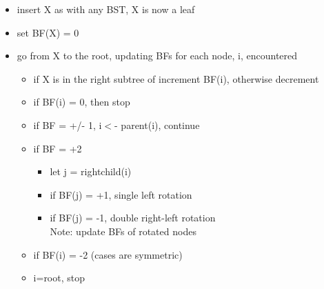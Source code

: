 \documentclass{article}
\begin{document}
		\begin{itemize}
			\item insert X as with any BST, X is now a leaf
			\item set BF(X) = 0
			\item go from X to the root, updating BFs for each node, i, encountered
			\begin{itemize}
				\item if X is in the right subtree of increment BF(i), otherwise decrement
				\item if BF(i) = 0, then stop
				\item if BF = +/- 1, i$<$- parent(i), continue
				\item if BF = +2
				\begin{itemize}
					\item let j = rightchild(i)
					\item if BF(j) = +1, single left rotation
					\item if BF(j) = -1, double right-left rotation\\
					Note: update BFs of rotated nodes
				\end{itemize}
				\item if BF(i) = -2 (cases are symmetric)
				\item i=root, stop\\
			\end{itemize}
		\end{itemize}
\end{document}
